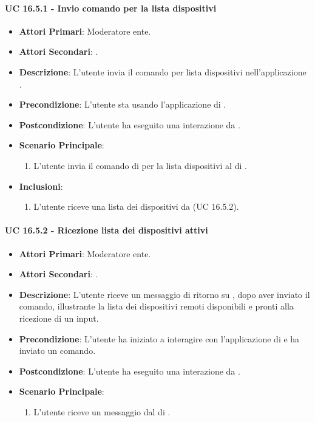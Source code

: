 		\paragraph{UC 16.5.1 - Invio comando per la lista dispositivi}
		\begin{itemize}
			\item \textbf{Attori Primari}: Moderatore ente.
			\item \textbf{Attori Secondari}: .
			\item \textbf{Descrizione}: L'utente invia il comando per lista dispositivi nell'applicazione .
			\item \textbf{Precondizione}: L'utente sta usando l'applicazione di .
			\item \textbf{Postcondizione}: L'utente ha eseguito una interazione da .
			\item \textbf{Scenario Principale}:
			\begin{enumerate}
				\item L'utente invia il comando di per la lista dispositivi al  di .
			\end{enumerate}
			\item \textbf{Inclusioni}:
			\begin{enumerate}
				\item L'utente riceve una lista dei dispositivi da  (UC 16.5.2).
			\end{enumerate}
		\end{itemize}

		\paragraph{UC 16.5.2 - Ricezione lista dei dispositivi attivi}
		\begin{itemize}
			\item \textbf{Attori Primari}: Moderatore ente.
			\item \textbf{Attori Secondari}: .
			\item \textbf{Descrizione}: L'utente riceve un messaggio di ritorno su , dopo aver inviato il comando, illustrante la lista dei dispositivi remoti disponibili e pronti alla ricezione di un input. 
			\item \textbf{Precondizione}: L'utente ha iniziato a interagire con l'applicazione di  e ha inviato un comando.
			\item \textbf{Postcondizione}: L'utente ha eseguito una interazione da .
			\item \textbf{Scenario Principale}:
			\begin{enumerate}
				\item L'utente riceve un messaggio dal  di .
			\end{enumerate}
		\end{itemize}	


